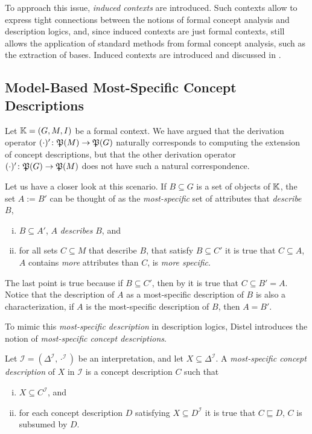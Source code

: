 To approach this issue, \emph{induced contexts} are introduced.  Such contexts allow to
express tight connections between the notions of formal concept analysis and description
logics, and, since induced contexts are just formal contexts, still allows the application
of standard methods from formal concept analysis, such as the extraction of bases.
Induced contexts are introduced and discussed in .

\subsection{Model-Based Most-Specific Concept Descriptions}
\label{sec:defin-and-basic}

Let ${\mathbb{K}} = (G, M, I)$ be a formal context.  We have argued that the derivation operator
$(\cdot)' \colon {\ensuremath{\mathfrak{P}(M)}} \to {\ensuremath{\mathfrak{P}(G)}}$ naturally corresponds to computing the
extension of concept descriptions, but that the other derivation operator $(\cdot)' \colon
{\ensuremath{\mathfrak{P}(G)}} \to {\ensuremath{\mathfrak{P}(M)}}$ does not have such a natural correspondence.

Let us have a closer look at this scenario.  If $B \subseteq G$ is a set of objects of
${\mathbb{K}}$, the set $A := B'$ can be thought of as the \emph{most-specific} set of
attributes that \emph{describe} $B$, \ie
\begin{enumerate}[i. ]
\item $B \subseteq A'$, \ie $A$ \emph{describes} $B$, and
\item for all sets $C \subseteq M$ that describe $B$, \ie that satisfy $B \subseteq C'$ it
  is true that $C \subseteq A$, \ie $A$ contains \emph{more} attributes than $C$, \ie is
  \emph{more specific}.
\end{enumerate}
The last point is true because if $B \subseteq C'$, then by
 it is true that $C \subseteq B' = A$.  Notice
that the description of $A$ as a most-specific description of $B$ is also a
characterization, \ie if $A$ is the most-specific description of $B$, then $A = B'$.

To mimic this \emph{most-specific description} in description logics, Distel introduces
the notion of \emph{most-specific concept descriptions}.

\begin{Definition}
  \label{def:most-specific-concept-description}
  Let $\mathcal{I} = (\Delta^{\mathcal{I}}, \cdot^{\mathcal{I}})$ be an interpretation, and
  let $X \subseteq \Delta^{\mathcal{I}}$.  A \emph{most-specific concept description} of
  $X$ in $\mathcal{I}$ is a concept description $C$ such that
  \begin{enumerate}[i. ]
  \item $X \subseteq C^{\mathcal{I}}$, and
  \item for each concept description $D$ satisfying $X \subseteq D^{\mathcal{I}}$ it is
    true that $C \sqsubseteq D$, \ie $C$ is subsumed by $D$.
  \end{enumerate}
\end{Definition}

